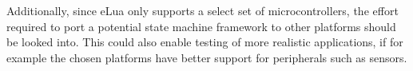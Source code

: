 \noindent
Additionally, since eLua only supports a select set of microcontrollers, the effort required to port a potential state machine framework to other platforms should be looked into. This could also enable testing of more realistic applications, if for example the chosen platforms have better support for peripherals such as sensors.